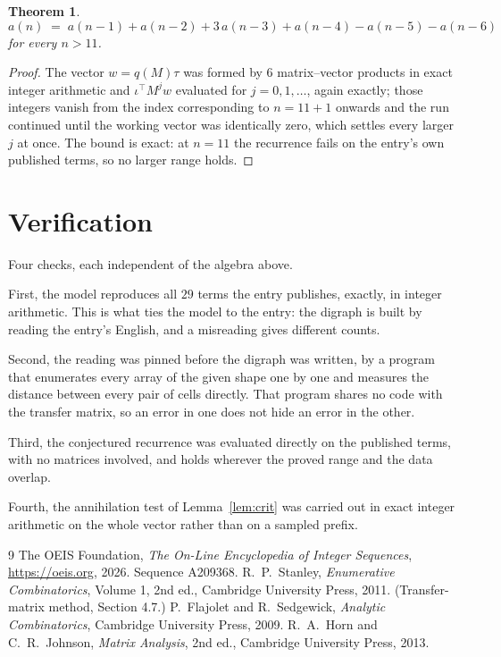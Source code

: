 \documentclass[11pt,a4paper]{article}
\theoremstyle{plain}
\newtheorem{theorem}{Theorem}
\theoremstyle{definition}
\begin{document}
\begin{theorem}
\[
a(n)\;=\;a(n-1) + a(n-2) + 3\,a(n-3) + a(n-4) - a(n-5) - a(n-6)
\]
for every $n>11$.
\end{theorem}

\begin{proof}
The vector $w=q(M)\tau$ was formed by $6$ matrix--vector products in exact integer
arithmetic and $\iota^{\!\top}M^{j}w$ evaluated for $j=0,1,\dots$, again exactly; those
integers vanish from the index corresponding to $n=11+1$ onwards and the run continued
until the working vector was identically zero, which settles every larger $j$ at once. The bound is exact: at $n=11$ the recurrence fails on the entry's own published terms, so no larger range holds.
\end{proof}

\section{Verification}

Four checks, each independent of the algebra above.

First, the model reproduces all $29$ terms the entry publishes, exactly, in integer
arithmetic. This is what ties the model to the entry: the digraph is built by reading the
entry's English, and a misreading gives different counts.

Second, the reading was pinned before the digraph was written, by a program that enumerates
every array of the given shape one by one and measures the distance between every pair
of cells directly. That program shares no code with the transfer matrix, so an error in one does not
hide an error in the other.

Third, the conjectured recurrence was evaluated directly on the published terms, with no
matrices involved, and holds wherever the proved range and the data overlap.

Fourth, the annihilation test of Lemma~\ref{lem:crit} was carried out in exact integer
arithmetic on the whole vector rather than on a sampled prefix.

\begin{thebibliography}{9}
 The OEIS Foundation, \emph{The On-Line Encyclopedia of Integer
Sequences}, \url{https://oeis.org}, 2026. Sequence A209368.
 R.~P.~Stanley, \emph{Enumerative Combinatorics}, Volume 1, 2nd ed.,
Cambridge University Press, 2011. (Transfer-matrix method, Section 4.7.)
 P.~Flajolet and R.~Sedgewick, \emph{Analytic Combinatorics}, Cambridge
University Press, 2009.
 R.~A.~Horn and C.~R.~Johnson, \emph{Matrix Analysis}, 2nd ed., Cambridge
University Press, 2013.
\end{thebibliography}
\end{document}
